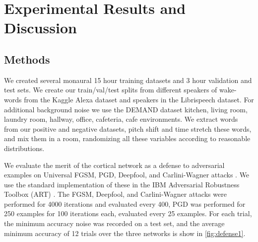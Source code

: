 \documentclass{article}
\begin{document}
\section{Experimental Results and Discussion}
\subsection{Methods}

We created several monaural 15 hour training datasets and 3 hour validation and test sets.
We create our train/val/test splits from different speakers of wake-words from the Kaggle Alexa dataset and speakers in the Librispeech dataset. %
For additional background noise we use the DEMAND dataset kitchen, living room, laundry room, hallway, office, cafeteria, cafe environments.
We extract words from our positive and negative datasets, pitch shift and time stretch these words, and mix them in a room, randomizing all these variables according to reasonable distributions. %

We evaluate the merit of the cortical network as a defense to adversarial examples on Universal FGSM, PGD, Deepfool, and Carlini-Wagner attacks \cite{fgsm,pgd,deepfool,cw,univadv}. We use the standard implementation of these in the IBM Adversarial Robustness Toolbox (ART) \cite{ibmart}.
The FGSM, Deepfool, and Carlini-Wagner attacks were performed for 4000 iterations and evaluated every 400, PGD was performed for 250 examples for 100 iterations each, evaluated every 25 examples.
For each trial, the minimum accuracy noise was recorded on a test set, and the average minimum accuracy of 12 trials over the three networks is show in \cref{fig:defense1}.
\begin{comment}
We developed an algorithm to extract separate words from speech, which we use to isolate single words from the Librispeech dataset for negative example words. We use this algorithm and fine tune it manually when necessary on the Alexa dataset to extract start/end times positive words (but keep surrounding audio including noise), and we use it unsupervised on Librispeech to extract negative words. Positive words are augmented randomly to have duration between 400ms and 900ms (drawn from a distribution fitted on the training speakers), and to have a base frequency drawn from $\mathcal{U}( [80,350] \cap [ f_{\mathrm{source}} - 60, f_{\mathrm{source}} + 60 ] )$ Hz using the high quality C++ sound library Rubberband \cite{rubberband}. Negative words have modified length multiplied by $\mathcal{U}([0.8,1.2])$, and modified pitch multiplied by $\mathcal{U}([0.8,1.4])$ using the same library. To form a single sound clip, words are randomly selected to be positive or negative, and arranged with silence ($\mathcal{U}(50,150)$ ms) to form a multi channel clip. Background noise form DEMAND is added as an additional channel. To form the single channel audio the channels are normalized to -15 dBFS and simulated in a bedroom or living room with absorption $\mathcal{U}([0.4,0.9])$ with random distances from the simulated microphone \cite{pyroom_acoustics}. Finally the single channel is normalized -15 dBFS and quantized to 16-bits.
\end{comment}
\end{document}
